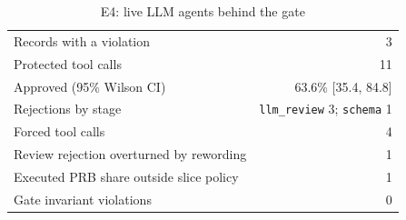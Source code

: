 \begin{table}[!t]
\centering
\caption{E4: live LLM agents behind the gate}\label{tab:live}
\begin{tabular}{lr}
\hline
Records with a violation & 3 \\
Protected tool calls & 11 \\
Approved (95\% Wilson CI) & 63.6\% [35.4, 84.8] \\
Rejections by stage & \texttt{llm\_review} 3; \texttt{schema} 1 \\
Forced tool calls & 4 \\
Review rejection overturned by rewording & 1 \\
Executed PRB share outside slice policy & 1 \\
Gate invariant violations & 0 \\
\hline
\end{tabular}
\end{table}
